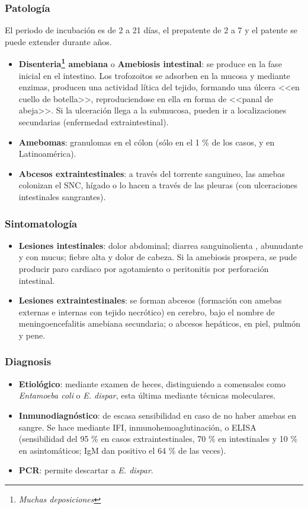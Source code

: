 \documentclass[10pt,a4paper,onecolumn,openany]{book}
\begin{document}
\subsubsection{Patología}
El periodo de incubación es de 2 a 21 días, el prepatente de 2 a 7 y el patente se puede extender durante años.
\begin{itemize}[itemsep=0pt,parsep=0pt,topsep=0pt,partopsep=0pt]
	\item\textbf{Disenteria\footnote{\textit{Muchas deposiciones}} amebiana} o \textbf{Amebiosis intestinal}: se produce en la fase inicial en el intestino. Los trofozoitos se adsorben en la mucosa y mediante enzimas, producen una actividad lítica del tejido, formando una úlcera <<en cuello de botella>>, reproduciendose en ella en forma de <<panal de abeja>>. Si la ulceración llega a la submucosa, pueden ir a localizaciones secundarias (enfermedad extraintestinal).
	\item\textbf{Amebomas}: granulomas en el cólon (sólo en el 1 \% de los casos, y en Latinoamérica).
	\item\textbf{Abcesos extraintestinales}: a través del torrente sanguineo, las amebas colonizan el SNC, hígado o lo hacen a través de las pleuras (con ulceraciones intestinales sangrantes).
\end{itemize}
\subsubsection{Sintomatología} 
\begin{itemize}[itemsep=0pt,parsep=0pt,topsep=0pt,partopsep=0pt]
	\item\textbf{Lesiones intestinales}: dolor abdominal; diarrea sanguinolienta , abunudante y con mucus; fiebre alta y dolor de cabeza. Si la amebiosis prospera, se pude producir paro cardiaco por agotamiento o peritonitis por perforación intestinal.
	\item\textbf{Lesiones extraintestinales}: se forman abcesos (formación con amebas externas e internas con tejido necrótico) en cerebro, bajo el nombre de meningoencefalitis amebiana secundaria; o abcesos hepáticos, en piel, pulmón y pene.
\end{itemize}
\subsubsection{Diagnosis}
\begin{itemize}[itemsep=0pt,parsep=0pt,topsep=0pt,partopsep=0pt]
	\item\textbf{Etiológico}: mediante examen de heces, distinguiendo a comensales como \textit{Entamoeba coli} o \textit{E. dispar}, esta última mediante técnicas moleculares.
	\item\textbf{Inmunodiagnóstico}: de escasa sensibilidad en caso de no haber amebas en sangre. Se hace mediante IFI, inmunohemoaglutinación, o ELISA (sensibilidad del 95 \% en casos extraintestinales, 70 \% en intestinales y 10 \% en asintomáticos; IgM dan positivo el 64 \% de las veces).
	\item\textbf{PCR}: permite descartar a \textit{E. dispar}.
\end{itemize}
\newpage
\end{document}

